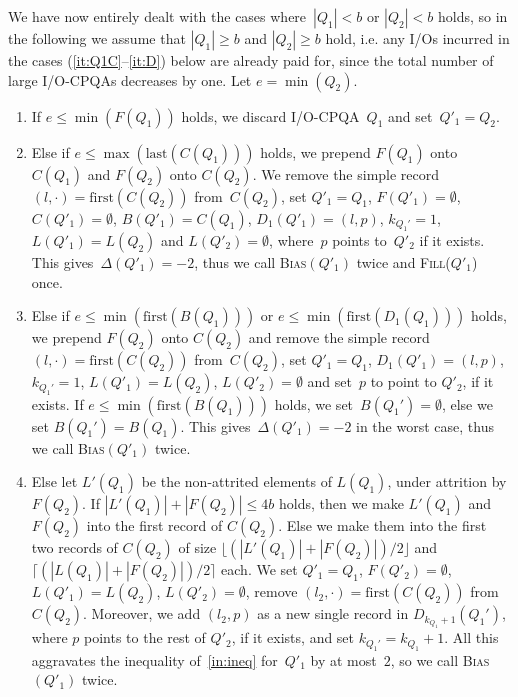 \documentclass{sig-alternate}
\newcommand{\first}{\text{first}}
\newcommand{\last}{\text{last}}
\newcommand{\iref}[1]{\ref{#1}} \newcommand{\attr}[1]{\widetilde{#1}}
\renewcommand{\(}{\left(}
\renewcommand{\)}{\right)}
\begin{document}
We have now entirely dealt with the cases where~$|Q_1| < b$ or $|Q_2| < b$
holds, so in the following we assume that $|Q_1| \geq b$ and $|Q_2| \geq b$
hold, i.e. any I/Os incurred in the cases (\ref{it:Q1C}--\ref{it:D}) below are
already paid for, since the total number of large I/O-CPQAs decreases by one.
Let $e = \min(Q_2)$.

\begin{enumerate}
  \item \label{it:Q1C} If $e \leq \min(F(Q_1))$ holds, we discard
    I/O-CPQA~$Q_1$ and set~$Q'_1 = Q_2$.

  \item \label{it:Q1lastC} Else if $e \leq \max(\last(C(Q_1)))$ holds, we
    prepend $F(Q_1)$ onto $C(Q_1)$ and $F(Q_2)$ onto $C(Q_2)$. We remove the
    simple record $(l,\cdot) = \first(C(Q_2))$ from~$C(Q_2)$, set $Q'_1=Q_1$,
    $F(Q'_1) = \emptyset$, $C(Q'_1) = \emptyset$, $B(Q'_1) = C(Q_1)$, $D_1(Q'_1)
    = (l,p)$, $k_{Q_1'} = 1$, $L(Q'_1) = L(Q_2)$ and $L(Q'_2) = \emptyset$,
    where~$p$ points to~$Q'_2$ if it exists. This gives~$\Delta (Q'_1) = - 2$,
    thus we call \textsc{Bias}$(Q'_1)$ twice and \textsc{Fill}($Q'_1$) once.

  \item \label{it:B} Else if $e \leq \min(\first(B(Q_1)))$ or $e \leq
    \min(\first(D_1(Q_1)))$ holds, we prepend $F(Q_2)$ onto $C(Q_2)$ and remove
    the simple record $(l,\cdot) = \first(C(Q_2))$ from~$C(Q_2)$, set
    $Q'_1=Q_1$, $D_1(Q'_1) =(l,p)$, $k_{Q_1'} = 1$, $L(Q'_1) = L(Q_2)$, $L(Q'_2)
    = \emptyset$ and set~$p$ to point to $Q'_2$, if it exists. If $e \leq
    \min(\first(B(Q_1)))$ holds, we set~$B(Q_1') = \emptyset$, else we set
    $B(Q_1') = B(Q_1)$. This gives~$\Delta (Q'_1) = - 2$ in the worst case, thus
    we call \textsc{Bias}$(Q'_1)$ twice.

  \item \label{it:D} Else let $L'(Q_1)$ be the non-attrited elements of
    $L(Q_1)$, under attrition by $F(Q_2)$. If $|L'(Q_1)| + |F(Q_2)| \leq 4b$
    holds, then we make $L'(Q_1)$ and $F(Q_2)$ into the first record of
    $C(Q_2)$. Else we make them into the first two records of $C(Q_2)$ of size
    $\lfloor (|L'(Q_1)| + |F(Q_2)|)/2 \rfloor$ and $\lceil (|L(Q_1)| +
    |F(Q_2)|)/2 \rceil$ each. We set $Q'_1=Q_1$, $F(Q'_2) = \emptyset$, $L(Q'_1)
    = L(Q_2)$, $L(Q'_2) = \emptyset$, remove $(l_2,\cdot) =\first(C(Q_2))$ from
    $C(Q_2)$. Moreover, we add $(l_2,p)$ as a new single record in
    $D_{k_{Q_1}+1}(Q_1')$, where $p$ points to the rest of $Q'_2$, if it
    exists, and set $k_{Q_1'} = k_{Q_1}+1$. All this aggravates the inequality
    of~\iref{in:ineq} for~$Q'_1$ by at most~$2$, so we call
    \textsc{Bias}$(Q'_1)$ twice.
\end{enumerate}
\end{document}
